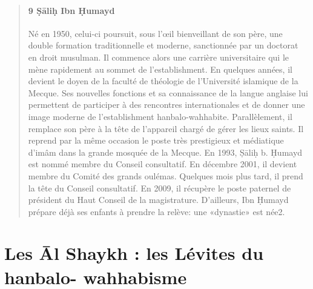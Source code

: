 \begin{quote}
\paragraph{9 Ṣāliḥ Ibn Ḥumayd}  Né en 1950, celui-ci poursuit, sous l'œil bienveillant de son père,
une double formation traditionnelle et moderne, sanctionnée par un
doctorat en droit musulman. Il commence alors une carrière universitaire
qui le mène rapidement au sommet de l'establishment. En quelques années,
il devient le doyen de la faculté de théologie de l'Université islamique
de la Mecque. Ses nouvelles fonctions et sa connaissance de la langue
anglaise lui permettent de participer à des rencontres internationales
et de donner une image moderne de l'establishment hanbalo-wahhabite.
Parallèlement, il remplace son père à la tête de l'appareil chargé de
gérer les lieux saints. Il reprend par la même occasion le poste très
prestigieux et médiatique d'imâm dans la grande mosquée de la Mecque. En
1993, Ṣāliḥ b. Ḥumayd est nommé membre du Conseil consultatif. En
décembre 2001, il devient membre du Comité des grands oulémas. Quelques
mois plus tard, il prend la tête du Conseil consultatif. En 2009, il
récupère le poste paternel de président du Haut Conseil de la
magistrature. D'ailleurs, Ibn Ḥumayd prépare déjà ses enfants à prendre
la relève: une «dynastie» est née2.
\end{quote}

\hypertarget{les-ux101l-shaykh-les-luxe9vites-du-hanbalo--wahhabisme}{%
\section{Les Āl Shaykh : les Lévites du hanbalo-
wahhabisme}\label{les-ux101l-shaykh-les-luxe9vites-du-hanbalo--wahhabisme}}

